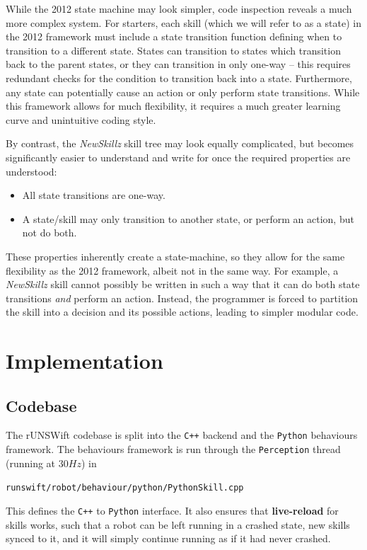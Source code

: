 While the 2012 state machine may look simpler, code inspection reveals a much more complex system. For starters, each skill (which we will refer to as a state) in the 2012 framework must include a state transition function defining when to transition to a different state. States can transition to states which transition back to the parent states, or they can transition in only one-way -- this requires redundant checks for the condition to transition back into a state. Furthermore, any state can potentially cause an action or only perform state transitions. While this framework allows for much flexibility, it requires a much greater learning curve and unintuitive coding style.

By contrast, the \textit{NewSkillz} skill tree may look equally complicated, but becomes significantly easier to understand and write for once the required properties are understood:

\begin{itemize}
\item All state transitions are one-way.
\item A state/skill may only transition to another state, or perform an action, but not do both.
\end{itemize}

These properties inherently create a state-machine, so they allow for the same flexibility as the 2012 framework, albeit not in the same way. For example, a \textit{NewSkillz} skill cannot possibly be written in such a way that it can do both state transitions \textit{and} perform an action. Instead, the programmer is forced to partition the skill into a decision and its possible actions, leading to simpler modular code.

\section{Implementation}

\subsection{Codebase}

The rUNSWift codebase is split into the \verb!C++! backend and the \verb!Python! behaviours framework. The behaviours framework is run through the \texttt{Perception} thread (running at $30Hz$) in 

\texttt{runswift/robot/behaviour/python/PythonSkill.cpp}

This defines the \verb!C++! to \verb!Python! interface. It also ensures that \textbf{live-reload} for skills works, such that a robot can be left running in a crashed state, new skills synced to it, and it will simply continue running as if it had never crashed.

